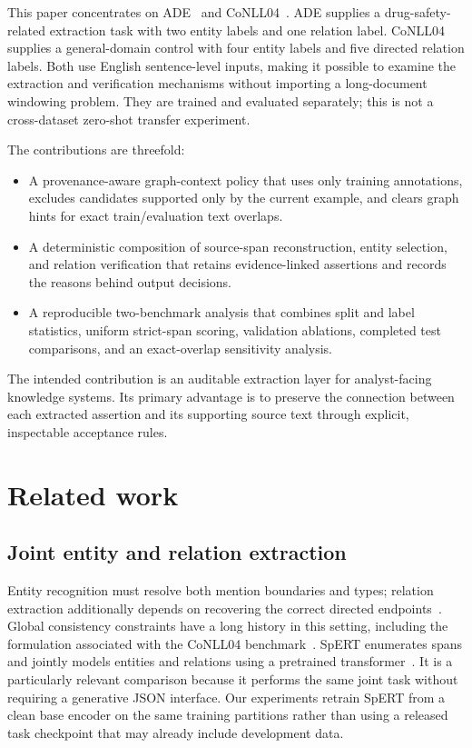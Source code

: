 \documentclass[preprint,12pt]{elsarticle}
\begin{document}
This paper concentrates on ADE~\cite{gurulingappa2012ade} and
CoNLL04~\cite{roth2004conll}. ADE supplies a drug-safety-related extraction
task with two entity labels and one relation label. CoNLL04 supplies a
general-domain control with four entity labels and five directed relation
labels. Both use English sentence-level inputs, making it possible to examine
the extraction and verification mechanisms without importing a long-document
windowing problem. They are trained and evaluated separately; this is not a
cross-dataset zero-shot transfer experiment.

The contributions are threefold:
\begin{itemize}
\item A provenance-aware graph-context policy that uses only training
annotations, excludes candidates supported only by the current example, and
clears graph hints for exact train/evaluation text overlaps.
\item A deterministic composition of source-span reconstruction, entity
selection, and relation verification that retains evidence-linked assertions
and records the reasons behind output decisions.
\item A reproducible two-benchmark analysis that combines split and label
statistics, uniform strict-span scoring, validation ablations, completed test
comparisons, and an exact-overlap sensitivity analysis.
\end{itemize}
The intended contribution is an auditable extraction layer for analyst-facing
knowledge systems. Its primary advantage is to preserve the connection between
each extracted assertion and its supporting source text through explicit,
inspectable acceptance rules.

\section{Related work}
\label{sec:related}
\subsection{Joint entity and relation extraction}
Entity recognition must resolve both mention boundaries and types; relation
extraction additionally depends on recovering the correct directed
endpoints~\cite{li2022ner}. Global consistency constraints have a long history
in this setting, including the formulation associated with the CoNLL04
benchmark~\cite{roth2004conll}. SpERT enumerates spans and jointly models
entities and relations using a pretrained transformer~\cite{eberts2020spert}.
It is a particularly relevant comparison because it performs the same joint
task without requiring a generative JSON interface. Our experiments retrain
SpERT from a clean base encoder on the same training partitions rather than
using a released task checkpoint that may already include development data.
\end{document}
